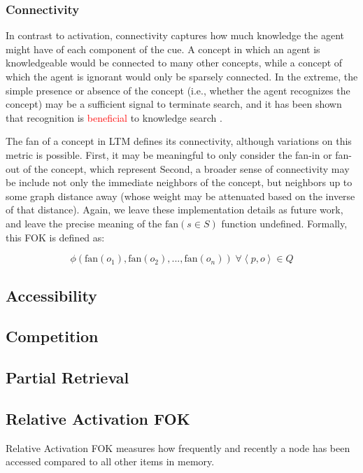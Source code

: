 \documentclass[10pt,letterpaper]{article}
\newcommand{\fixme}[2][]{#2}
\renewcommand{\fixme}[2][]{\textcolor{red}{#2}}
\newcommand{\tuple}[1]{\left \langle #1 \right \rangle }
\begin{document}
\subsubsection{Connectivity}

In contrast to activation, connectivity captures how much knowledge the agent might have of each component of the cue.
A concept in which an agent is knowledgeable would be connected to many other concepts, while a concept of which the agent is ignorant would only be sparsely connected.
In the extreme, the simple presence or absence of the concept (i.e., whether the agent recognizes the concept) may be a sufficient signal to terminate search, and it has been shown that recognition is \fixme{beneficial} to knowledge search \cite{Li2012FunctionalInteractionsBetween}.

The fan of a concept in LTM defines its connectivity, although variations on this metric is possible.
First, it may be meaningful to only consider the fan-in or fan-out of the concept, which represent 
Second, a broader sense of connectivity may be include not only the immediate neighbors of the concept, but neighbors up to some graph distance away (whose weight may be attenuated based on the inverse of that distance).
Again, we leave these implementation details as future work, and leave the precise meaning of the $\text{fan}(s{\in}S)$ function undefined.
Formally, this FOK is defined as:

$$\phi\left(\text{fan}(o_1), \text{fan}(o_2), ..., \text{fan}(o_n)\right) \; \forall {\tuple{p, o}{\in}Q}$$

\subsection{Accessibility}

\subsection{Competition}

\subsection{Partial Retrieval}

\subsection{Relative Activation FOK}

Relative Activation FOK measures how frequently and recently a node has been accessed compared to all other items in memory.
\end{document}
